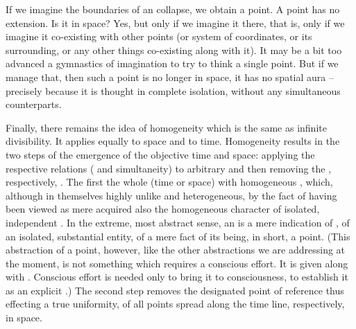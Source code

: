 If we imagine the boundaries of an  collapse, we obtain a point. A
point has no extension. Is it in space? Yes, but only if we imagine it there,
that is, only if we imagine it co-existing with other points (or system of
coordinates, or its surrounding, or any other things co-existing
along with it). It may be a bit too advanced a gymnastics of imagination to try
to think a single point. But if we manage that, then such a point is no longer
in space, it has no spatial aura -- precisely because it is thought in complete
isolation, without any simultaneous counterparts.

\pa Finally, there remains the idea of homogeneity which is the same as infinite
divisibility. It applies equally to space and to time.
Homogeneity results in the two steps of the emergence of the objective time and
space: applying the respective relations ( and simultaneity) to
arbitrary  and then removing the  ,
respectively, .  The first  the whole (time or space) with
homogeneous , which, although in themselves highly unlike and
heterogeneous, by the fact of having been viewed as mere  acquired
also the homogeneous character of isolated, independent . In the
extreme, most abstract sense, an  is a mere indication of
, of an isolated, substantial entity, of a mere fact of its
being, in short, a point.  (This abstraction of a point, however, like the other
abstractions we are addressing at the moment, is not something which requires a
conscious effort. It is given along with . Conscious effort
is needed only to bring it to  consciousness, to establish it as an
explicit .)  The second step removes the designated point of
reference thus effecting a true uniformity,  of all points
spread along the time line, respectively, in space.

